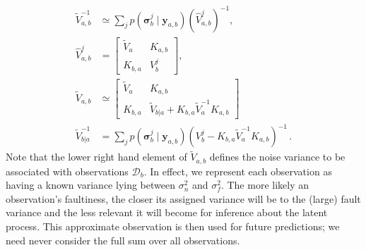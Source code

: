 \documentclass{article} %
\newcommand{\given}{\!\ensuremath{\mid}\!}
\newcommand{\cm}[1]{\ensuremath{\mathcal{#1}}}
\newcommand{\bm}[1]{\ensuremath{\mathbf{#1}}}
\newcommand{\data}{\ensuremath{\cm{D}}}
\newcommand{\vect}[1]{\bm{#1}}
\newcommand{\vy}{\vect{y}}
\newcommand{\vs}{\vect{\sigma}}
\newcommand{\fPr}{p}
\newcommand{\Prob}[2]{\fPr(#1 \given #2 )}
\newcommand{\defequal}{=}
\begin{document}
\begin{align*}
\tilde{V}^{-1}_{a,b} &\simeq \sum_j \Prob{\vs^j_{b}}{\vy_{a,b}} (\hat{V}^{j}_{a,b})^{-1},
\nonumber\\
\hat{V}^{j}_{a,b} & \defequal
\begin{bmatrix}
 \tilde{V}_a & K_{a,b}
\\
 K_{b,a} & V^j_b
\end{bmatrix},
\\
\tilde{V}_{a,b} & \simeq
\begin{bmatrix}
 \tilde{V}_a & K_{a,b}\\
 K_{b,a} & \tilde{V}_{b|a} + K_{b,a} \tilde{V}_a^{-1} K_{a,b}
\end{bmatrix}\\
% 
 \tilde{V}^{-1}_{b|a} & \defequal \sum_j \Prob{\vs^j_{b}}{\vy_{a,b}} (V^j_b -K_{b,a} \tilde{V}_a^{-1}K_{a,b})^{-1}\,.
\end{align*}
 Note that the
lower right hand element of $\tilde{V}_{a,b}$ defines the noise
variance to be associated with observations $\data_b$. In effect, we represent
each observation as having a known variance lying between
$\sigma_n^2$ and $\sigma_f^2$. The more likely an observation's
faultiness, the closer its assigned variance will be to the (large)
fault variance and the less relevant it will become for inference
about the latent process. This approximate observation is then used
for future predictions; we need never consider the full sum over all
observations. 
\end{document}
